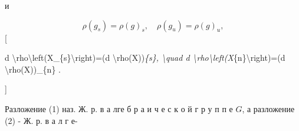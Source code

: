 \documentclass[10pt]{article}
\begin{document}
и



\[

\rho\left(g_{s}\right)=\rho(g)_{s}, \quad \rho\left(g_{u}\right)=\rho(g)_{u},

\][



d \textbackslash rho\textbackslash left(X\_\{s\}\textbackslash right)=(d \textbackslash rho(X))\textit{\{s\}, \textbackslash quad d \textbackslash rho\textbackslash left(X}\{n\}\textbackslash right)=(d \textbackslash rho(X))\_\{n\} .

]



Разложение (1) наз. Ж. р. в а лге б р а и ч е с к о й г р у п п е $G$, а разложение (2) - Ж. р. в а л г е-
\end{document}
